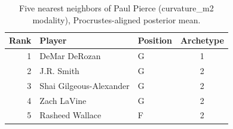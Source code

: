 \begin{table}[htbp]
  \centering\small
  \begin{tabular}{rllc}
    \toprule
    Rank & Player & Position & Archetype \\
    \midrule
    1 & DeMar DeRozan & G & 1 \\
    2 & J.R. Smith & G & 2 \\
    3 & Shai Gilgeous-Alexander & G & 2 \\
    4 & Zach LaVine & G & 2 \\
    5 & Rasheed Wallace & F & 2 \\
    \bottomrule
  \end{tabular}
  \caption{Five nearest neighbors of Paul Pierce (curvature_m2 modality), Procrustes-aligned posterior mean.}
  \label{tab:Paul_Pierce_neighbors_curvature_m2}
\end{table}

